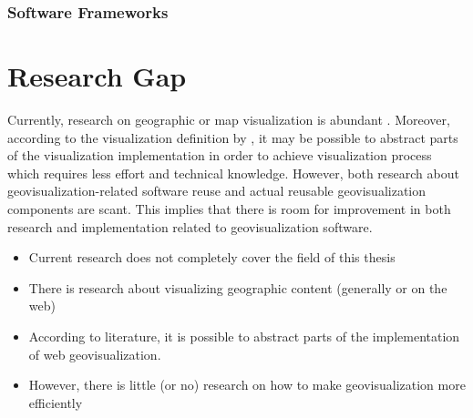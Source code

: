 
\subsection{Software Frameworks}





\chapter{Research Gap}
\label{chapter:researchgap}

Currently, research on geographic or map visualization is abundant . Moreover, according to the visualization definition by \citet{kosara_visualization_2007}, it may be possible to abstract parts of the visualization implementation in order to achieve visualization process which requires less effort and technical knowledge. However, both research about geovisualization-related software reuse and actual reusable geovisualization components are scant. This implies that there is room for improvement in both research and implementation related to geovisualization software. 

\begin{itemize}
	\item Current research does not completely cover the field of this thesis
	\item There is research about visualizing geographic content (generally or on the web)
	\item According to literature, it is possible to abstract parts of the implementation of web geovisualization.
	\item However, there is little (or no) research on how to make geovisualization more efficiently
\end{itemize}
